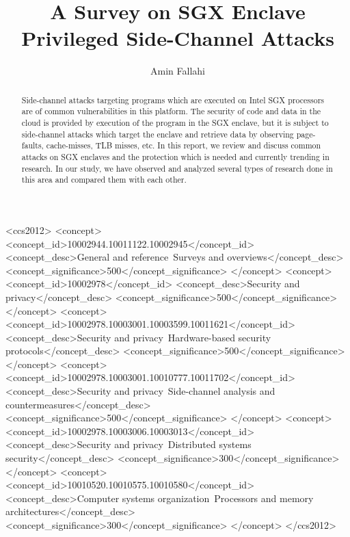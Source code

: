\documentclass[format=acmsmall, review=false, screen=true]{acmart}
\begin{document}
\title{A Survey on SGX Enclave Privileged Side-Channel Attacks}

\author{Amin Fallahi}

\begin{abstract}
Side-channel attacks targeting programs which are executed on Intel SGX processors are of common vulnerabilities in this platform. The security of code and data in the cloud is provided by execution of the program in the SGX enclave, but it is subject to side-channel attacks which target the enclave and retrieve data by observing page-faults, cache-misses, TLB misses, etc. In this report, we review and discuss common attacks on SGX enclaves and the protection which is needed and currently trending in research. In our study, we have observed and analyzed several types of research done in this area and compared them with each other.%
\end{abstract}


%
%
 \begin{CCSXML}
	<ccs2012>
	<concept>
	<concept_id>10002944.10011122.10002945</concept_id>
	<concept_desc>General and reference~Surveys and overviews</concept_desc>
	<concept_significance>500</concept_significance>
	</concept>
	<concept>
	<concept_id>10002978</concept_id>
	<concept_desc>Security and privacy</concept_desc>
	<concept_significance>500</concept_significance>
	</concept>
	<concept>
	<concept_id>10002978.10003001.10003599.10011621</concept_id>
	<concept_desc>Security and privacy~Hardware-based security protocols</concept_desc>
	<concept_significance>500</concept_significance>
	</concept>
	<concept>
	<concept_id>10002978.10003001.10010777.10011702</concept_id>
	<concept_desc>Security and privacy~Side-channel analysis and countermeasures</concept_desc>
	<concept_significance>500</concept_significance>
	</concept>
	<concept>
	<concept_id>10002978.10003006.10003013</concept_id>
	<concept_desc>Security and privacy~Distributed systems security</concept_desc>
	<concept_significance>300</concept_significance>
	</concept>
	<concept>
	<concept_id>10010520.10010575.10010580</concept_id>
	<concept_desc>Computer systems organization~Processors and memory architectures</concept_desc>
	<concept_significance>300</concept_significance>
	</concept>
	</ccs2012>
\end{CCSXML}
\end{document}
